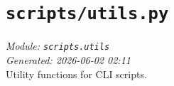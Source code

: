 
\section{\texttt{scripts/utils.py}}
\textit{Module: \texttt{scripts.utils}} \\
\textit{Generated: 2026-06-02 02:11} \\

Utility functions for CLI scripts.
